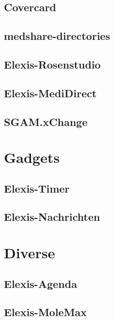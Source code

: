 \documentclass[paper=a4,BCOR8.25mm]{scrartcl}
\begin{document}
\subsection{Covercard}
\subsection{medshare-directories}
\subsection{Elexis-Rosenstudio}
\subsection{Elexis-MediDirect}
\subsection{SGAM.xChange}


\section{Gadgets}
\subsection{Elexis-Timer}
\subsection{Elexis-Nachrichten}

\section{Diverse}
\subsection{Elexis-Agenda}
\subsection{Elexis-MoleMax}
\end{document}
